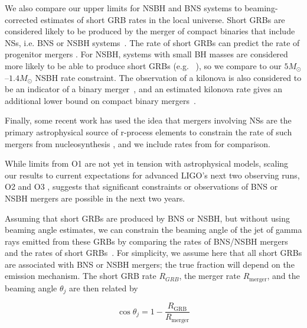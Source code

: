 We also compare our upper limits for \ac{NSBH} and \ac{BNS} systems to beaming-corrected
estimates of short \ac{GRB} rates in the local universe. Short \acp{GRB} are
considered likely to be produced by the merger of compact
binaries that include \acp{NS}, i.e. \ac{BNS} or \ac{NSBH}
systems~\citep{Berger:2013jza}. The rate of short \acp{GRB} can
predict the rate of progenitor mergers %
\citep{Coward:2012gn,Petrillo:2012ij,Siellez:2013hia,Fong:2015oha}.
For \ac{NSBH}, systems with small \ac{BH} masses are considered more likely to be able to
produce short \acp{GRB} (e.g.~ \citep{Duez:2009yz,Giacomazzo:2012zt,Pannarale:2015jia}), so we compare to our
$5 M_{\odot}$--$1.4 M_{\odot}$
\ac{NSBH} rate constraint. The observation of a kilonova is also considered to be an
indicator of a binary merger~\citep{Metzger:2011bv}, and an estimated kilonova rate
gives an additional lower bound on compact binary mergers~\citep{Jin:2015txa}.

Finally, some recent work has used the idea that mergers involving \acp{NS}
are the primary astrophysical source of r-process
elements \citep{1974ApJ...192L.145L,Qian:2007vq} to constrain the rate of such
mergers from nucleosynthesis \citep{Bauswein:2014vfa,Vangioni:2015ofa}, and we
include rates from \citep{Vangioni:2015ofa} for comparison.

While limits from \ac{O1} are not yet in tension with astrophysical models, scaling
our results to current expectations for advanced \ac{LIGO}'s next two observing runs,
O2 and O3 \citep{Aasi:2013wya}, suggests that significant constraints or
observations of \ac{BNS} or \ac{NSBH} mergers are possible in the next two years.

Assuming that short \acp{GRB} are produced by \ac{BNS} or \ac{NSBH}, but
without using beaming angle estimates, we can constrain the beaming angle of the jet
of gamma rays emitted from these \acp{GRB} by comparing the rates of
\ac{BNS}/\ac{NSBH} mergers and the rates of
short \acp{GRB}~\citep{Chen:2012qh}.
For simplicity, we assume here that all short \acp{GRB} are associated with \ac{BNS}
or \ac{NSBH} mergers; the true fraction will
depend on the emission mechanism.  The short \ac{GRB} rate $R_{GRB}$, the merger rate
$R_{\mathrm{merger}}$, and the beaming angle $\theta_j$ are then related by
%
\begin{linenomath*}
\begin{equation}\label{eq:beaming}
\cos \theta_j = 1 - \frac{R_{\mathrm{GRB}}}{R_{\mathrm{merger}}}
\end{equation}
\end{linenomath*}

